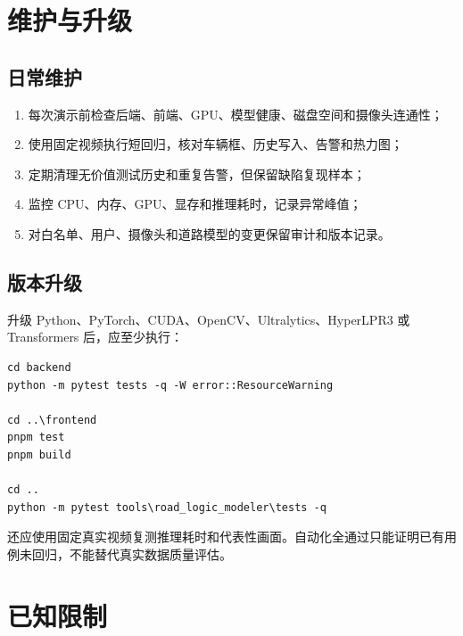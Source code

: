 \section{维护与升级}\label{manual-ux7ef4ux62a4ux4e0eux5347ux7ea7}

\subsection{日常维护}\label{manual-ux65e5ux5e38ux7ef4ux62a4}

\begin{enumerate}
\def\labelenumi{\arabic{enumi}.}
\tightlist
\item
  每次演示前检查后端、前端、GPU、模型健康、磁盘空间和摄像头连通性；
\item
  使用固定视频执行短回归，核对车辆框、历史写入、告警和热力图；
\item
  定期清理无价值测试历史和重复告警，但保留缺陷复现样本；
\item
  监控 CPU、内存、GPU、显存和推理耗时，记录异常峰值；
\item
  对白名单、用户、摄像头和道路模型的变更保留审计和版本记录。
\end{enumerate}

\subsection{版本升级}\label{manual-ux7248ux672cux5347ux7ea7}

升级 Python、PyTorch、CUDA、OpenCV、Ultralytics、HyperLPR3 或 Transformers 后，应至少执行：

\begin{Verbatim}[breaklines=true,breakanywhere=true,fontsize=\small,frame=single,framesep=2mm,rulecolor=\color{STransLine}]
cd backend
python -m pytest tests -q -W error::ResourceWarning

cd ..\frontend
pnpm test
pnpm build

cd ..
python -m pytest tools\road_logic_modeler\tests -q
\end{Verbatim}

还应使用固定真实视频复测推理耗时和代表性画面。自动化全通过只能证明已有用例未回归，不能替代真实数据质量评估。

\section{已知限制}\label{manual-ux5df2ux77e5ux9650ux5236}

